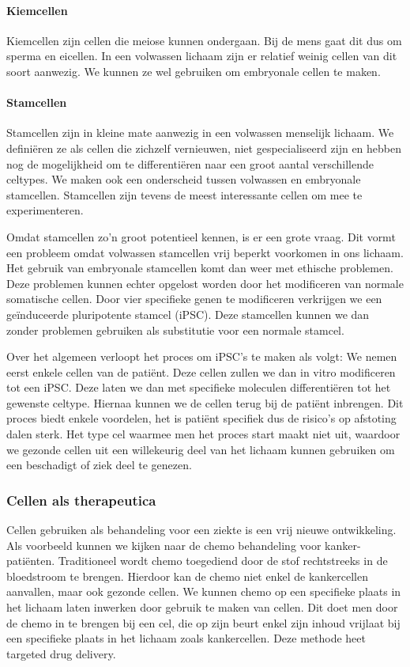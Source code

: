 \documentclass[a4paper,kul]{kulakarticle} %
\begin{document}
\paragraph{Kiemcellen}
Kiemcellen zijn cellen die meiose kunnen ondergaan. Bij de mens gaat dit dus om sperma en eicellen. In een volwassen lichaam zijn er relatief weinig cellen van dit soort aanwezig. We kunnen ze wel gebruiken om embryonale cellen te maken. 
\paragraph{Stamcellen}
Stamcellen zijn in kleine mate aanwezig in een volwassen menselijk lichaam. We definiëren ze als cellen die zichzelf vernieuwen, niet gespecialiseerd zijn en hebben nog de mogelijkheid om te differentiëren naar een groot aantal verschillende celtypes. We maken ook een onderscheid tussen volwassen en embryonale stamcellen. Stamcellen zijn tevens de meest interessante cellen om mee te experimenteren.

Omdat stamcellen zo'n groot potentieel kennen, is er een grote vraag. Dit vormt een probleem omdat volwassen stamcellen vrij beperkt voorkomen in ons lichaam. Het gebruik van embryonale stamcellen komt dan weer met ethische problemen. Deze problemen kunnen echter opgelost worden door het modificeren van normale somatische cellen. Door vier specifieke genen te modificeren verkrijgen we een geïnduceerde pluripotente stamcel (iPSC). Deze stamcellen kunnen we dan zonder problemen gebruiken als substitutie voor een normale stamcel.

Over het algemeen verloopt het proces om iPSC's te maken als volgt: We nemen eerst enkele cellen van de patiënt. Deze cellen zullen we dan in vitro modificeren tot een iPSC. Deze laten we dan met specifieke moleculen differentiëren tot het gewenste celtype. Hiernaa kunnen we de cellen terug bij de patiënt inbrengen. Dit proces biedt enkele voordelen, het is patiënt specifiek dus de risico's op afstoting dalen sterk. Het type cel waarmee men het proces start maakt niet uit, waardoor we gezonde cellen uit een willekeurig deel van het lichaam kunnen gebruiken om een beschadigt of ziek deel te genezen. 
\subsubsection{Cellen als therapeutica}
Cellen gebruiken als behandeling voor een ziekte is een vrij nieuwe ontwikkeling. Als voorbeeld kunnen we kijken naar de chemo behandeling voor kanker-patiënten. Traditioneel wordt chemo toegediend door de stof rechtstreeks in de bloedstroom te brengen. Hierdoor kan de chemo niet enkel de kankercellen aanvallen, maar ook gezonde cellen. We kunnen chemo op een specifieke plaats in het lichaam laten inwerken door gebruik te maken van cellen. Dit doet men door de chemo in te brengen bij een cel, die op zijn beurt enkel zijn inhoud vrijlaat bij een specifieke plaats in het lichaam zoals kankercellen. Deze methode heet targeted drug delivery.
\end{document}

